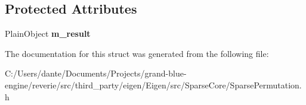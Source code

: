 \subsection*{Protected Attributes}
\begin{DoxyCompactItemize}
\item 
\mbox{\label{struct_eigen_1_1internal_1_1product__evaluator_3_01_product_3_01_lhs_00_01_rhs_00_01_alias_free_0706ef7a5a2e7de13f2e1755913a650d_af1f20735e079bed247a3fbd74225a5bd}} 
Plain\+Object {\bfseries m\+\_\+result}
\end{DoxyCompactItemize}


The documentation for this struct was generated from the following file\+:\begin{DoxyCompactItemize}
\item 
C\+:/\+Users/dante/\+Documents/\+Projects/grand-\/blue-\/engine/reverie/src/third\+\_\+party/eigen/\+Eigen/src/\+Sparse\+Core/Sparse\+Permutation.\+h\end{DoxyCompactItemize}
